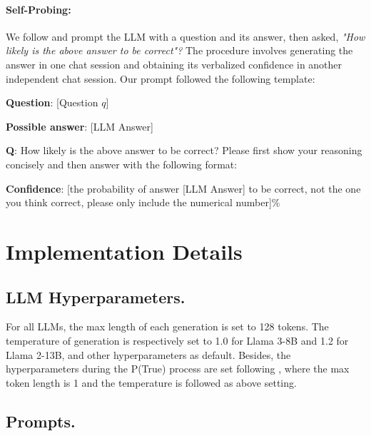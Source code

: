 \documentclass[11pt]{article}
\begin{document}
\paragraph{Self-Probing: } 
We follow \citet{xiong2023can} and prompt the LLM with a question and its answer, then asked, \textit{"How likely is the above answer to be correct"?} The procedure involves generating the answer in one chat session and obtaining its verbalized confidence in another independent chat session. Our prompt followed the following template:

\begin{tcolorbox}[
    colframe=black,  %
    colback=white,   %
    rounded corners=north, %
    arc=1mm, %
    boxrule=.4mm, %
    width=\linewidth, %
    coltitle=black, 
    colbacktitle=white,
    title={\textbf{Self-Probing}}, %
    fonttitle=\bfseries, %
]
\textbf{Question}: [Question $q$]

\textbf{Possible answer}: [LLM Answer]

\vspace{5pt}

\textbf{Q}: How likely is the above answer to be correct? Please first show your reasoning concisely and then answer with the following format:

\textbf{Confidence}: [the probability of answer [LLM Answer] to be correct, not the one you think correct, please only include the numerical number]\%
\end{tcolorbox}

\section{Implementation Details}
\label{app:imple}

\subsection{LLM Hyperparameters.}
\label{app:imple:hyper}
For all LLMs, the max length of each generation is set to 128 tokens. The temperature of generation is respectively set to 1.0 for Llama 3-8B and 1.2 for Llama 2-13B, and other hyperparameters as default. Besides, the hyperparameters during the P(True) process are set following \citet{kadavath2022language}, where the max token length is 1 and the temperature is followed as above setting.
\subsection{Prompts.}
\label{app:imple:prompt}
\end{document}
